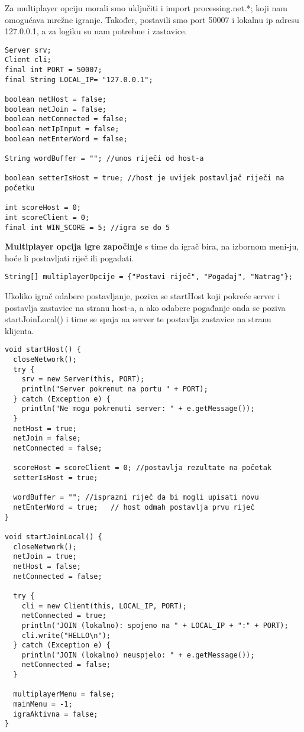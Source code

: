 \documentclass{article}
\begin{document}
Za multiplayer opciju morali smo uključiti i import processing.net.*; koji nam omogućava mrežne 
igranje. Također, postavili smo port 50007 i lokalnu ip adresu 127.0.0.1, a za logiku su nam potrebne i zastavice.

\begin{verbatim}
Server srv;
Client cli;
final int PORT = 50007;
final String LOCAL_IP= "127.0.0.1";

boolean netHost = false;
boolean netJoin = false;
boolean netConnected = false;
boolean netIpInput = false;
boolean netEnterWord = false;

String wordBuffer = ""; //unos riječi od host-a

boolean setterIsHost = true; //host je uvijek postavljač riječi na početku

int scoreHost = 0;
int scoreClient = 0;
final int WIN_SCORE = 5; //igra se do 5
\end{verbatim}

\textbf{Multiplayer opcija igre započinje} s time da igrač bira, na izbornom meni-ju, hoće li postavljati riječ ili pogađati.

\begin{verbatim}
String[] multiplayerOpcije = {"Postavi riječ", "Pogađaj", "Natrag"};
\end{verbatim}


Ukoliko igrač odabere postavljanje, poziva se startHost koji pokreće server i postavlja zastavice na stranu host-a, a ako odabere pogađanje onda se poziva startJoinLocal() i time se spaja na server te postavlja zastavice na stranu klijenta.

\begin{verbatim}
void startHost() {
  closeNetwork();
  try {
    srv = new Server(this, PORT);
    println("Server pokrenut na portu " + PORT);
  } catch (Exception e) {
    println("Ne mogu pokrenuti server: " + e.getMessage());
  }
  netHost = true;
  netJoin = false;
  netConnected = false;

  scoreHost = scoreClient = 0; //postavlja rezultate na početak
  setterIsHost = true;

  wordBuffer = ""; //isprazni riječ da bi mogli upisati novu
  netEnterWord = true;   // host odmah postavlja prvu riječ
}

void startJoinLocal() {
  closeNetwork();
  netJoin = true;
  netHost = false;
  netConnected = false;

  try {
    cli = new Client(this, LOCAL_IP, PORT);
    netConnected = true;
    println("JOIN (lokalno): spojeno na " + LOCAL_IP + ":" + PORT);
    cli.write("HELLO\n");
  } catch (Exception e) {
    println("JOIN (lokalno) neuspjelo: " + e.getMessage());
    netConnected = false;
  }

  multiplayerMenu = false; 
  mainMenu = -1;    
  igraAktivna = false;
}
\end{verbatim}
\end{document}
